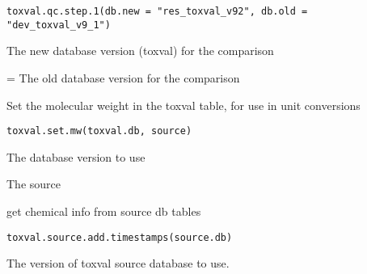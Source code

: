 \documentclass[letterpaper]{book}
\begin{document}
%
\begin{Usage}
\begin{verbatim}
toxval.qc.step.1(db.new = "res_toxval_v92", db.old = "dev_toxval_v9_1")
\end{verbatim}
\end{Usage}
%
\begin{Arguments}
\begin{ldescription}
\item[\code{db.new}] The new database version (toxval) for the comparison

\item[\code{db.old}] = The old database version for the comparison
\end{ldescription}
\end{Arguments}
%
\begin{Description}\relax
Set the molecular weight in the toxval table, for use in unit conversions
\end{Description}
%
\begin{Usage}
\begin{verbatim}
toxval.set.mw(toxval.db, source)
\end{verbatim}
\end{Usage}
%
\begin{Arguments}
\begin{ldescription}
\item[\code{toxval.db}] The database version to use

\item[\code{source}] The source
\end{ldescription}
\end{Arguments}
%
\begin{Description}\relax
get chemical info from source db tables
\end{Description}
%
\begin{Usage}
\begin{verbatim}
toxval.source.add.timestamps(source.db)
\end{verbatim}
\end{Usage}
%
\begin{Arguments}
\begin{ldescription}
\item[\code{source.db}] The version of toxval source database to use.
\end{ldescription}
\end{Arguments}
\end{document}

